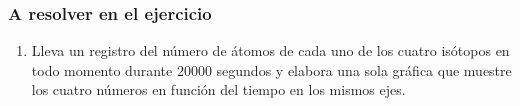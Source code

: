 \documentclass[12pt]{beamer}
\begin{document}
\begin{frame}
\frametitle{A resolver en el ejercicio}
\begin{enumerate}[<+->]
\conti
\item Lleva un registro del número de átomos de cada uno de los cuatro isótopos en todo momento durante $20000$ segundos y elabora una sola gráfica que muestre los cuatro números en función del tiempo en los mismos ejes.
\end{enumerate}
\end{frame}

\end{document}
